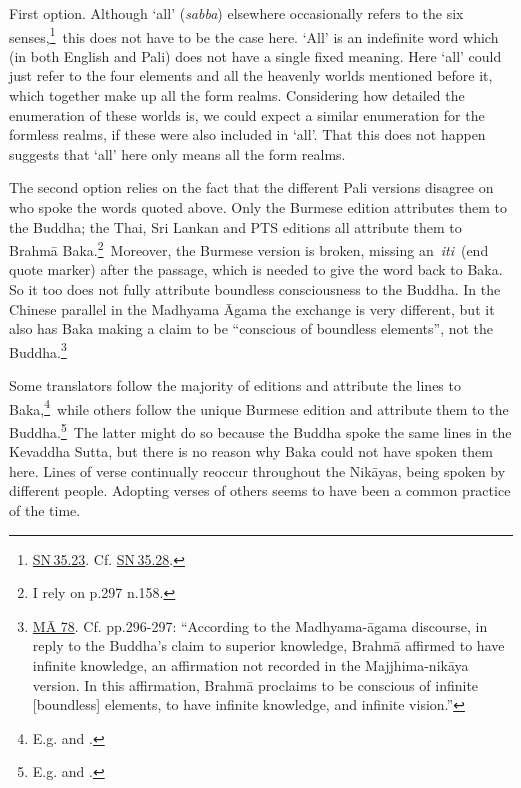 \documentclass[10pt, openany]{book}
\begin{document}
First option. Although ‘all’ (\textit{sabba}) elsewhere occasionally refers to the six senses,\footnote {\href{https://suttacentral.net/sn35.23/en/sujato}{SN 35.23}. Cf. \href{https://suttacentral.net/sn35.28/en/sujato}{SN 35.28}.} this does not have to be the case here. ‘All’ is an indefinite word which (in both English and Pali) does not have a single fixed meaning. Here ‘all’ could just refer to the four elements and all the heavenly worlds mentioned before it, which together make up all the form realms. Considering how detailed the enumeration of these worlds is, we could expect a similar enumeration for the formless realms, if these were also included in ‘all’. That this does not happen suggests that ‘all’ here only means all the form realms.


The second option relies on the fact that the different Pali versions disagree on who spoke the words quoted above. Only the Burmese edition attributes them to the Buddha; the Thai, Sri Lankan and PTS editions all attribute them to Brahmā Baka.\footnote {I rely on \cite{Anālayo 2010} p.297 n.158.} Moreover, the Burmese version is broken, missing an \textit{iti} (end quote marker) after the passage, which is needed to give the word back to Baka. So it too does not fully attribute boundless consciousness to the Buddha. In the Chinese parallel in the Madhyama Āgama the exchange is very different, but it also has Baka making a claim to be “conscious of boundless elements”, not the Buddha.\footnote {\href{https://suttacentral.net/ma78}{MĀ 78}. Cf. \cite{Anālayo 2010} pp.296-297: “According to the Madhyama-āgama discourse, in reply to the Buddha's claim to superior knowledge, Brahmā affirmed to have infinite knowledge, an affirmation not recorded in the Majjhima-nikāya version. In this affirmation, Brahmā proclaims to be conscious of infinite [boundless] elements, to have infinite knowledge, and infinite vision.”}


Some translators follow the majority of editions and attribute the lines to Baka,\footnote {E.g. \cite{Horner} and \cite{Sujato 2018}.} while others follow the unique Burmese edition and attribute them to the Buddha.\footnote {E.g. \cite{Ñāṇamoli} and \cite{Ṭhānissaro}.} The latter might do so because the Buddha spoke the same lines in the Kevaddha Sutta, but there is no reason why Baka could not have spoken them here. Lines of verse continually reoccur throughout the Nikāyas, being spoken by different people. Adopting verses of others seems to have been a common practice of the time.
\end{document}
